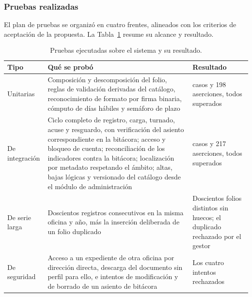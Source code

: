\subsubsection*{Pruebas realizadas}

El plan de pruebas se organizó en cuatro frentes, alineados con los criterios de aceptación de la propuesta. La Tabla~\ref{tab:pruebas} resume su alcance y resultado.

\begin{table}[H]
  \centering
  \small
  \renewcommand{\arraystretch}{1.3}
  \caption{Pruebas ejecutadas sobre el sistema y su resultado.}
  \label{tab:pruebas}
  \begin{tabularx}{\textwidth}{@{}>{\raggedright\arraybackslash}p{2.7cm}>{\raggedright\arraybackslash}X>{\raggedright\arraybackslash}p{2.6cm}@{}}
    \toprule
    \textbf{Tipo} & \textbf{Qué se probó} & \textbf{Resultado} \\
    \midrule
    Unitarias & Composición y descomposición del folio, reglas de validación derivadas del catálogo, reconocimiento de formato por firma binaria, cómputo de días hábiles y semáforo de plazo & 72 casos y 198 aserciones, todos superados \\
    De integración & Ciclo completo de registro, carga, turnado, acuse y resguardo, con verificación del asiento correspondiente en la bitácora; acceso y bloqueo de cuenta; reconciliación de los indicadores contra la bitácora; localización por metadato respetando el ámbito; altas, bajas lógicas y versionado del catálogo desde el módulo de administración & 55 casos y 217 aserciones, todos superados \\
    De serie larga & Doscientos registros consecutivos en la misma oficina y año, más la inserción deliberada de un folio duplicado & Doscientos folios distintos sin huecos; el duplicado rechazado por el gestor \\
    De seguridad & Acceso a un expediente de otra oficina por dirección directa, descarga del documento sin perfil para ello, e intentos de modificación y de borrado de un asiento de bitácora & Los cuatro intentos rechazados \\
    \bottomrule
  \end{tabularx}
\end{table}


